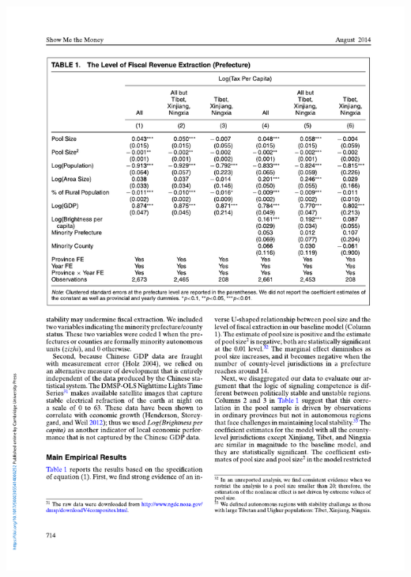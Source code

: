 \documentclass[
  10pt,
  ignorenonframetext,
]{beamer}
\begin{document}
\begin{frame}
\begin{center}\includegraphics[width=0.9\linewidth]{Figs/Examples/lu_res} \end{center}
\end{frame}
\end{document}
